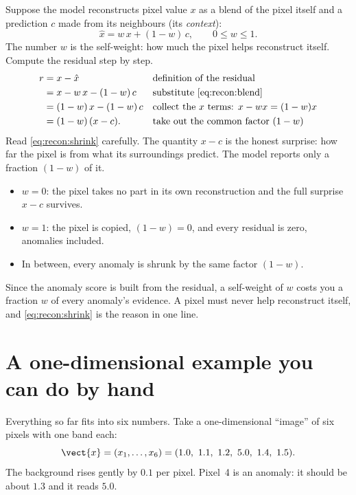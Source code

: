 Suppose the model reconstructs pixel value $x$ as a blend of the pixel itself and a prediction $c$
made from its neighbours (its \emph{context}):
\begin{equation}\label{eq:recon:blend}
\hat{x} = w\,x + (1-w)\,c,\qquad 0\le w\le 1.
\end{equation}
The number $w$ is the self-weight: how much the pixel helps reconstruct itself. Compute the residual
step by step.
\begin{align}
r &= x - \hat{x}
  && \text{definition of the residual}\notag\\
  &= x - w\,x - (1-w)\,c
  && \text{substitute \cref{eq:recon:blend}}\notag\\
  &= (1-w)\,x - (1-w)\,c
  && \text{collect the $x$ terms: } x - wx = (1-w)x\notag\\
  &= (1-w)\,(x - c).
  && \text{take out the common factor $(1-w)$}\label{eq:recon:shrink}
\end{align}
Read \cref{eq:recon:shrink} carefully. The quantity $x-c$ is the honest surprise: how far the pixel is
from what its surroundings predict. The model reports only a fraction $(1-w)$ of it.
\begin{itemize}
\item $w=0$: the pixel takes no part in its own reconstruction and the full surprise $x-c$ survives.
\item $w=1$: the pixel is copied, $(1-w)=0$, and every residual is zero, anomalies included.
\item In between, every anomaly is shrunk by the same factor $(1-w)$.
\end{itemize}
Since the anomaly score is built from the residual, a self-weight of $w$ costs you a fraction $w$ of
every anomaly's evidence. A pixel must never help reconstruct itself, and \cref{eq:recon:shrink} is the
reason in one line.

\section{A one-dimensional example you can do by hand}\label{sec:recon:oned}

Everything so far fits into six numbers. Take a one-dimensional ``image'' of six pixels with one band
each:
\begin{equation}\label{eq:recon:signal}
\vect{x} = (x_1,\dots,x_6) = (1.0,\ 1.1,\ 1.2,\ 5.0,\ 1.4,\ 1.5).
\end{equation}
The background rises gently by $0.1$ per pixel. Pixel~4 is an anomaly: it should be about $1.3$ and
it reads $5.0$.

